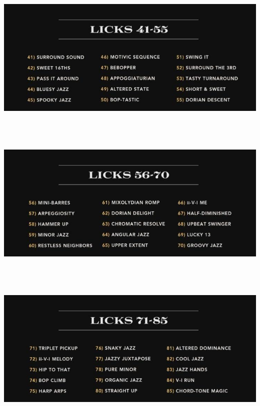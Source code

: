 \documentclass[a4paper]{book}
\begin{document}
\begin{center}
\includegraphics[width=17cm,height=7.177cm]{lebluessupportsmethodes-img34.jpg}
\end{center}


\begin{center}
\includegraphics[width=17cm,height=7.177cm]{lebluessupportsmethodes-img35.jpg}
\end{center}


\begin{center}
\includegraphics[width=17cm,height=7.177cm]{lebluessupportsmethodes-img36.jpg}
\end{center}
\end{document}
